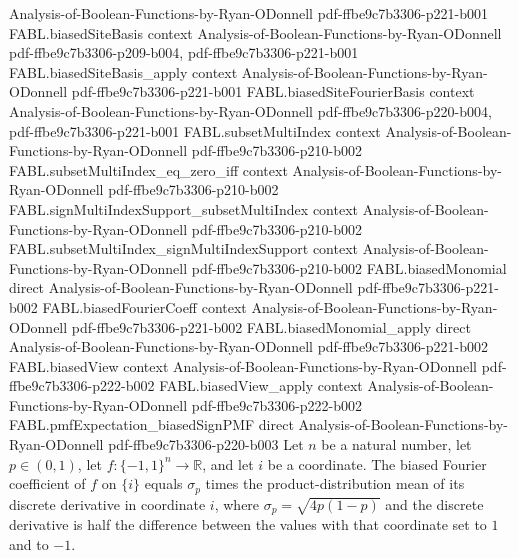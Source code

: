 \begin{theorem}
  {Analysis-of-Boolean-Functions-by-Ryan-ODonnell}
  {pdf-ffbe9c7b3306-p221-b001}
\proofstep
  {FABL.biasedSiteBasis}
  {context}
  {Analysis-of-Boolean-Functions-by-Ryan-ODonnell}
  {pdf-ffbe9c7b3306-p209-b004,
    pdf-ffbe9c7b3306-p221-b001}
\proofstep
  {FABL.biasedSiteBasis_apply}
  {context}
  {Analysis-of-Boolean-Functions-by-Ryan-ODonnell}
  {pdf-ffbe9c7b3306-p221-b001}
\proofstep
  {FABL.biasedSiteFourierBasis}
  {context}
  {Analysis-of-Boolean-Functions-by-Ryan-ODonnell}
  {pdf-ffbe9c7b3306-p220-b004,
    pdf-ffbe9c7b3306-p221-b001}
\proofstep
  {FABL.subsetMultiIndex}
  {context}
  {Analysis-of-Boolean-Functions-by-Ryan-ODonnell}
  {pdf-ffbe9c7b3306-p210-b002}
\proofstep
  {FABL.subsetMultiIndex_eq_zero_iff}
  {context}
  {Analysis-of-Boolean-Functions-by-Ryan-ODonnell}
  {pdf-ffbe9c7b3306-p210-b002}
\proofstep
  {FABL.signMultiIndexSupport_subsetMultiIndex}
  {context}
  {Analysis-of-Boolean-Functions-by-Ryan-ODonnell}
  {pdf-ffbe9c7b3306-p210-b002}
\proofstep
  {FABL.subsetMultiIndex_signMultiIndexSupport}
  {context}
  {Analysis-of-Boolean-Functions-by-Ryan-ODonnell}
  {pdf-ffbe9c7b3306-p210-b002}
\proofstep
  {FABL.biasedMonomial}
  {direct}
  {Analysis-of-Boolean-Functions-by-Ryan-ODonnell}
  {pdf-ffbe9c7b3306-p221-b002}
\proofstep
  {FABL.biasedFourierCoeff}
  {context}
  {Analysis-of-Boolean-Functions-by-Ryan-ODonnell}
  {pdf-ffbe9c7b3306-p221-b002}
\proofstep
  {FABL.biasedMonomial_apply}
  {direct}
  {Analysis-of-Boolean-Functions-by-Ryan-ODonnell}
  {pdf-ffbe9c7b3306-p221-b002}
\proofstep
  {FABL.biasedView}
  {context}
  {Analysis-of-Boolean-Functions-by-Ryan-ODonnell}
  {pdf-ffbe9c7b3306-p222-b002}
\proofstep
  {FABL.biasedView_apply}
  {context}
  {Analysis-of-Boolean-Functions-by-Ryan-ODonnell}
  {pdf-ffbe9c7b3306-p222-b002}
\proofstep
  {FABL.pmfExpectation_biasedSignPMF}
  {direct}
  {Analysis-of-Boolean-Functions-by-Ryan-ODonnell}
  {pdf-ffbe9c7b3306-p220-b003}
Let $n$ be a natural number, let $p\in(0,1)$, let $f:\{ -1,1\}^n\to\mathbb R$, and let
$i$ be a coordinate. The biased Fourier coefficient of $f$ on $\{i\}$ equals $\sigma_p$
times the product-distribution mean of its discrete derivative in coordinate $i$, where
$\sigma_p=\sqrt{4p(1-p)}$ and the discrete derivative is half the difference between the
values with that coordinate set to $1$ and to $-1$.
\end{theorem}

